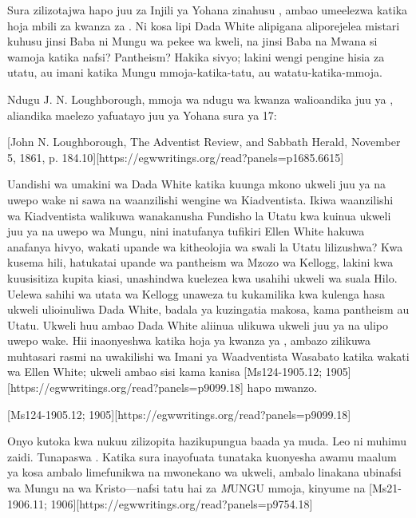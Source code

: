 Sura zilizotajwa hapo juu za Injili ya Yohana zinahusu , ambao umeelezwa katika hoja mbili za kwanza za . Ni kosa lipi Dada White alipigana aliporejelea mistari kuhusu jinsi Baba ni Mungu wa pekee wa kweli, na jinsi Baba na Mwana si wamoja katika nafsi? Pantheism? Hakika sivyo; lakini wengi pengine hisia za utatu, au imani katika Mungu mmoja-katika-tatu, au watatu-katika-mmoja.

Ndugu J. N. Loughborough, mmoja wa ndugu wa kwanza walioandika juu ya , aliandika maelezo yafuatayo juu ya Yohana sura ya 17:

[John N. Loughborough, The Adventist Review, and Sabbath Herald, November 5, 1861, p. 184.10][https://egwwritings.org/read?panels=p1685.6615]

Uandishi wa umakini wa Dada White katika kuunga mkono ukweli juu ya  na uwepo wake ni sawa na waanzilishi wengine wa Kiadventista. Ikiwa waanzilishi wa Kiadventista walikuwa wanakanusha Fundisho la Utatu kwa kuinua ukweli juu ya  na uwepo wa Mungu, nini inatufanya tufikiri Ellen White hakuwa anafanya hivyo, wakati upande wa kitheolojia wa swali la Utatu lilizushwa? Kwa kusema hili, hatukatai upande wa pantheism wa Mzozo wa Kellogg, lakini kwa kuusisitiza kupita kiasi, unashindwa kuelezea kwa usahihi ukweli wa suala Hilo. Uelewa sahihi wa utata wa Kellogg unaweza tu kukamilika kwa kulenga hasa ukweli ulioinuliwa Dada White, badala ya kuzingatia makosa, kama pantheism au Utatu. Ukweli huu ambao Dada White aliinua ulikuwa ukweli juu ya  na ulipo uwepo wake. Hii inaonyeshwa katika hoja ya kwanza ya , ambazo zilikuwa muhtasari rasmi na uwakilishi wa Imani ya Waadventista Wasabato katika wakati wa Ellen White; ukweli ambao sisi kama kanisa [Ms124-1905.12; 1905][https://egwwritings.org/read?panels=p9099.18] hapo mwanzo.

[Ms124-1905.12; 1905][https://egwwritings.org/read?panels=p9099.18]

Onyo kutoka kwa nukuu zilizopita hazikupungua baada ya muda. Leo ni muhimu zaidi. Tunapaswa . Katika sura inayofuata tunataka kuonyesha awamu maalum ya kosa ambalo limefunikwa na mwonekano wa ukweli, ambalo linakana ubinafsi wa Mungu na wa Kristo—nafsi tatu hai za \textit MUNGU {mmoja}, kinyume na [Ms21-1906.11; 1906][https://egwwritings.org/read?panels=p9754.18]


